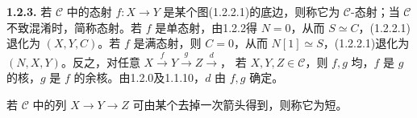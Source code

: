 \par\medskip\noindent\textbf{1.2.3.} 若 $\mathcal C$ 中的态射 $f:X\to Y$ 是某个图(1.2.2.1)的底边，则称它为 $\mathcal C$-态射；当 $\mathcal C$ 不致混淆时，简称态射。若 $f$ 是单态射，由1.2.2得 $N=0$，从而 $S\simeq C$，(1.2.2.1)退化为 $(X,Y,C)$。若 $f$ 是满态射，则 $C=0$，从而 $N[1]\simeq S$，(1.2.2.1)退化为 $(N,X,Y)$。反之，对任意 $X\xrightarrow{f}Y\xrightarrow{g}Z\xrightarrow{d}$，
若 $X,Y,Z\in\mathcal C$，则 $f,g$ 均，$f$ 是 $g$ 的核，$g$ 是 $f$ 的余核。由1.2.0及1.1.10，$d$ 由 $f,g$ 确定。

若 $\mathcal C$ 中的列 $X\to Y\to Z$ 可由某个去掉一次箭头得到，则称它为短。

